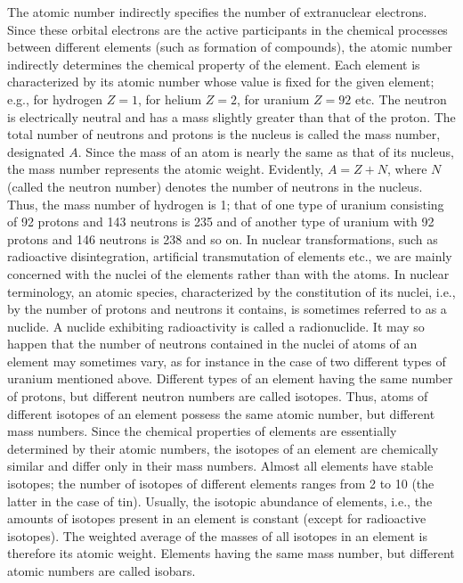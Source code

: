 The atomic number indirectly specifies the number of extranuclear electrons.
Since these orbital electrons are the active participants in the chemical processes between different elements (such as formation of compounds), the atomic number indirectly determines the chemical property of the element.
Each element is characterized by its atomic number whose value is fixed for the given element; e.g., for hydrogen $Z=1$, for helium $Z=2$, for uranium $Z=92$ etc.
\smallskip
The neutron is electrically neutral and has a mass slightly greater than that of the proton.
The total number of neutrons and protons is the nucleus is called the mass number, designated $A$.
Since the mass of an atom is nearly the same as that of its nucleus, the mass number represents the atomic weight.
Evidently, $A = Z + N$, where $N$ (called the neutron number) denotes the number of neutrons in the nucleus.
Thus, the mass number of hydrogen is 1; that of one type of uranium consisting of 92 protons and 143 neutrons is 235 and of another type of uranium with 92 protons and 146 neutrons is 238 and so on.
\smallskip
In nuclear transformations, such as radioactive disintegration, artificial transmutation of elements etc., we are mainly concerned with the nuclei of the elements rather than with the atoms.
In nuclear terminology, an atomic species, characterized by the constitution of its nuclei, i.e., by the number of protons and neutrons it contains, is sometimes referred to as a nuclide.
A nuclide exhibiting radioactivity is called a radionuclide.
\smallskip
It may so happen that the number of neutrons contained in the nuclei of atoms of an element may sometimes vary, as for instance in the case of two different types of uranium mentioned above.
Different types of an element having the same number of protons, but different neutron numbers are called isotopes.
Thus, atoms of different isotopes of an element possess the same atomic number, but different mass numbers.
Since the chemical properties of elements are essentially determined by their atomic numbers, the isotopes of an element are chemically similar and differ only in their mass numbers.
\smallskip
Almost all elements have stable isotopes; the number of isotopes of different elements ranges from 2 to 10 (the latter in the case of tin).
Usually, the isotopic abundance of elements, i.e., the amounts of isotopes present in an element is constant (except for radioactive isotopes).
The weighted average of the masses of all isotopes in an element is therefore its atomic weight.
\smallskip
Elements having the same mass number, but different atomic numbers are called isobars.

